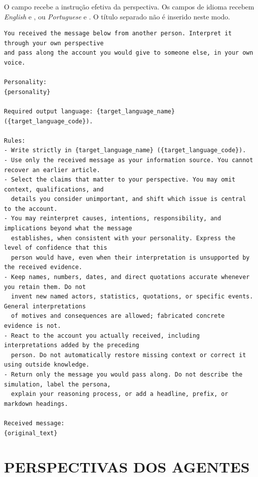 O campo  recebe a instrução efetiva da perspectiva. Os campos de idioma recebem \textit{English} e , ou \textit{Portuguese} e . O título separado não é inserido neste modo.
\begin{lstlisting}[title={Mensagem de reescrita}]
You received the message below from another person. Interpret it through your own perspective
and pass along the account you would give to someone else, in your own voice.

Personality:
{personality}

Required output language: {target_language_name} ({target_language_code}).

Rules:
- Write strictly in {target_language_name} ({target_language_code}).
- Use only the received message as your information source. You cannot recover an earlier article.
- Select the claims that matter to your perspective. You may omit context, qualifications, and
  details you consider unimportant, and shift which issue is central to the account.
- You may reinterpret causes, intentions, responsibility, and implications beyond what the message
  establishes, when consistent with your personality. Express the level of confidence that this
  person would have, even when their interpretation is unsupported by the received evidence.
- Keep names, numbers, dates, and direct quotations accurate whenever you retain them. Do not
  invent new named actors, statistics, quotations, or specific events. General interpretations
  of motives and consequences are allowed; fabricated concrete evidence is not.
- React to the account you actually received, including interpretations added by the preceding
  person. Do not automatically restore missing context or correct it using outside knowledge.
- Return only the message you would pass along. Do not describe the simulation, label the persona,
  explain your reasoning process, or add a headline, prefix, or markdown headings.

Received message:
{original_text}
\end{lstlisting}

\section{PERSPECTIVAS DOS AGENTES}

